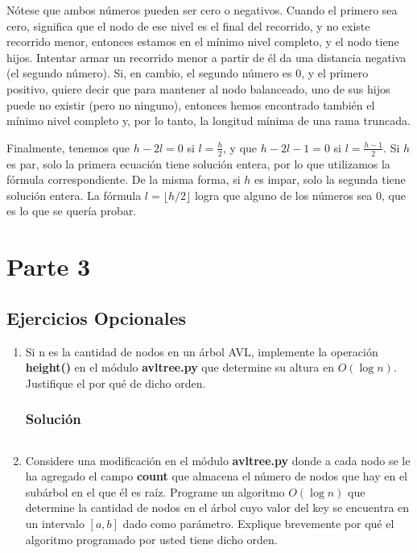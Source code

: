 \documentclass{article}
\begin{document}
Nótese que ambos números pueden ser cero o negativos. Cuando el primero sea cero, significa que el nodo de ese nivel es el final del recorrido, y no existe recorrido menor, entonces estamos en el mínimo nivel completo, y el nodo tiene hijos. Intentar armar un recorrido menor a partir de él da una distancia negativa (el segundo número). Si, en cambio, el segundo número es 0, y el primero positivo, quiere decir que para mantener al nodo balanceado, uno de sus hijos puede no existir (pero no ninguno), entonces hemos encontrado también el mínimo nivel completo y, por lo tanto, la longitud mínima de una rama truncada.

Finalmente, tenemos que $h-2l=0$ si $l=\frac{h}{2}$, y que $h-2l-1=0$ si $l=\frac{h-1}{2}$. Si $h$ es par, solo la primera ecuación tiene solución entera, por lo que utilizamos la fórmula correspondiente. De la misma forma, si $h$ es impar, solo la segunda tiene solución entera. La fórmula $l = \lfloor h/2 \rfloor$ logra que alguno de los números sea 0, que es lo que se quería probar.


\section*{Parte 3}
\subsection*{Ejercicios Opcionales}
\begin{enumerate}
    \item Si n es la cantidad de nodos en un árbol AVL, implemente la operación \textbf{height()} en el módulo \textbf{avltree.py} que determine su altura en $O(\log n)$. Justifique el por qué de dicho orden.
    \subsubsection*{Solución}
    \inputminted{python3}{./code/snippets/ejercicioopcional1.py}
    
    \item Considere una modificación en el módulo \textbf{avltree.py} donde a cada nodo se le ha agregado el campo \textbf{count} que almacena el número de nodos que hay en el subárbol en el que él es raíz. Programe un algoritmo $O(\log n)$ que determine la cantidad de nodos en el árbol cuyo valor del key se encuentra en un intervalo $[a, b]$ dado como parámetro. Explique brevemente por qué el algoritmo programado por usted tiene dicho orden.
\end{enumerate}
\end{document}
